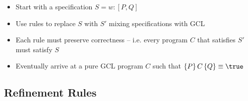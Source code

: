 \begin{itemize}
	\begin{itemize}
		
		\item Start with a specification $ S = w : [P, Q] $
		
		\item Use rules to replace $ S $ with $ S' $ mixing specifications with GCL
		
		\item Each rule must preserve correctness -- i.e. every program $ C $ that satisfies $ S' $ must satisfy $ S $
		
		\item Eventually arrive at a pure GCL program $ C $ such that $ \hoare{P}{C}{Q} \equiv \true $
		
	\end{itemize}
	
\end{itemize}

\newpage

\subsection{Refinement Rules}

